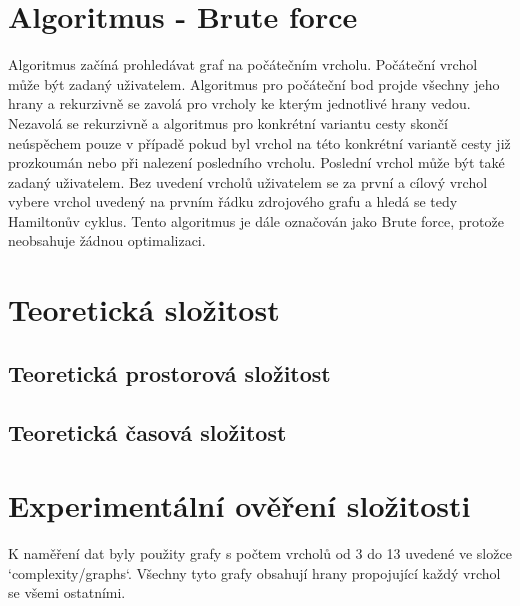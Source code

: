 \documentclass[a4paper,11pt]{article}
\begin{document}
\section{Algoritmus - Brute force}

Algoritmus začíná prohledávat graf na počátečním vrcholu. Počáteční vrchol může být zadaný uživatelem. Algoritmus pro počáteční bod projde všechny jeho hrany a rekurzivně se zavolá pro vrcholy ke kterým jednotlivé hrany vedou. Nezavolá se rekurzivně a algoritmus pro konkrétní variantu cesty skončí neúspěchem pouze v případě pokud byl vrchol na této konkrétní variantě cesty již prozkoumán nebo při nalezení posledního vrcholu. Poslední vrchol může být také zadaný uživatelem. Bez uvedení vrcholů uživatelem se za první a cílový vrchol vybere vrchol uvedený na prvním řádku zdrojového grafu a hledá se tedy Hamiltonův cyklus. Tento algoritmus je dále označován jako Brute force, protože neobsahuje žádnou optimalizaci.

\section{Teoretická složitost}

\subsection{Teoretická prostorová složitost}

\subsection{Teoretická časová složitost}

\section{Experimentální ověření složitosti}

K naměření dat byly použity grafy s počtem vrcholů od 3 do 13 uvedené ve složce `complexity/graphs`. Všechny tyto grafy obsahují hrany propojující každý vrchol se všemi ostatními.

\end{document}
